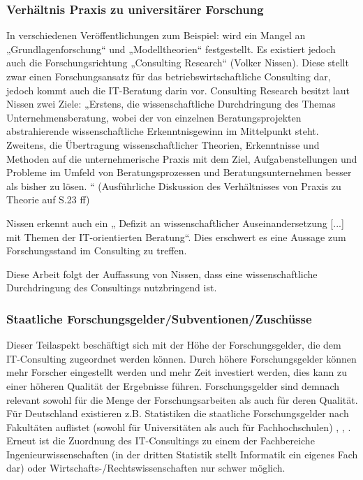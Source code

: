 \subsubsection*{Verhältnis Praxis zu universitärer Forschung}
In verschiedenen Veröffentlichungen zum Beispiel: \cite[1]{IDSScheer} wird ein Mangel an „Grundlagenforschung“ und „Modelltheorien“ festgestellt. Es existiert jedoch auch die Forschungsrichtung „Consulting Research“ (Volker Nissen). Diese stellt zwar einen Forschungsansatz für das betriebswirtschaftliche Consulting dar, jedoch kommt auch die IT-Beratung darin vor. Consulting Research besitzt laut Nissen zwei Ziele: „Erstens, die wissenschaftliche Durchdringung des Themas Unternehmensberatung, wobei der von einzelnen Beratungsprojekten abstrahierende wissenschaftliche Erkenntnisgewinn im Mittelpunkt steht. Zweitens, die Übertragung wissenschaftlicher Theorien, Erkenntnisse und Methoden auf die unternehmerische Praxis mit dem Ziel, Aufgabenstellungen und Probleme im Umfeld von Beratungsprozessen und Beratungsunternehmen besser als bisher zu lösen. “
(Ausführliche Diskussion des Verhältnisses von Praxis zu Theorie auf S.23 ff)

Nissen erkennt auch ein „ Defizit an wissenschaftlicher Auseinandersetzung [...] mit Themen der IT-orientierten Beratung“. Dies erschwert es eine Aussage zum Forschungsstand im Consulting zu treffen.

Diese Arbeit folgt der Auffassung von Nissen, dass eine wissenschaftliche Durchdringung des Consultings nutzbringend ist.

\subsubsection*{Staatliche Forschungsgelder/Subventionen/Zuschüsse}
Dieser Teilaspekt beschäftigt sich mit der Höhe der Forschungsgelder, die dem IT-Consulting zugeordnet werden können. Durch höhere Forschungsgelder können mehr Forscher eingestellt werden und mehr Zeit investiert werden, dies kann zu einer höheren Qualität der Ergebnisse führen. Forschungsgelder sind demnach relevant sowohl für die Menge der Forschungsarbeiten als auch für deren Qualität.
Für Deutschland existieren z.B. Statistiken die staatliche Forschungsgelder nach Fakultäten auflistet (sowohl für Universitäten als auch für Fachhochschulen) \cite {ausgabenfakuni}, \cite {ausgabenfakfach}, \cite {ausgabenbmbf}. Erneut ist die Zuordnung des IT-Consultings zu einem der Fachbereiche Ingenieurwissenschaften (in der dritten Statistik stellt Informatik ein eigenes Fach dar) oder Wirtschafts-/Rechtswissenschaften nur schwer möglich.



